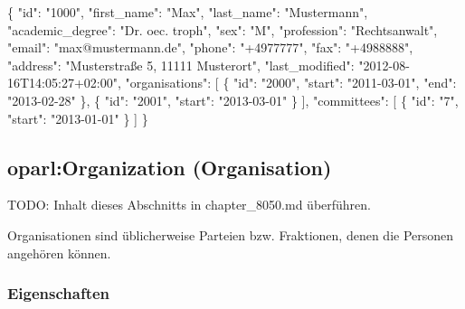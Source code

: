 \documentclass[,a4paper]{article}
\newenvironment{Shaded}{}{}
\newcommand{\DataTypeTok}[1]{\textcolor[rgb]{0.56,0.13,0.00}{{#1}}}
\newcommand{\StringTok}[1]{\textcolor[rgb]{0.25,0.44,0.63}{{#1}}}
\newcommand{\NormalTok}[1]{{#1}}
\begin{document}
\begin{Shaded}
\begin{Highlighting}[]
\NormalTok{\{}
    \DataTypeTok{"id"}\NormalTok{: }\StringTok{"1000"}\NormalTok{,}
    \DataTypeTok{"first_name"}\NormalTok{: }\StringTok{"Max"}\NormalTok{,}
    \DataTypeTok{"last_name"}\NormalTok{: }\StringTok{"Mustermann"}\NormalTok{,}
    \DataTypeTok{"academic_degree"}\NormalTok{: }\StringTok{"Dr. oec. troph"}\NormalTok{,}
    \DataTypeTok{"sex"}\NormalTok{: }\StringTok{"M"}\NormalTok{,}
    \DataTypeTok{"profession"}\NormalTok{: }\StringTok{"Rechtsanwalt"}\NormalTok{,}
    \DataTypeTok{"email"}\NormalTok{: }\StringTok{"max@mustermann.de"}\NormalTok{,}
    \DataTypeTok{"phone"}\NormalTok{: }\StringTok{"+4977777"}\NormalTok{,}
    \DataTypeTok{"fax"}\NormalTok{: }\StringTok{"+4988888"}\NormalTok{,}
    \DataTypeTok{"address"}\NormalTok{: }\StringTok{"Musterstraße 5, 11111 Musterort"}\NormalTok{,}
    \DataTypeTok{"last_modified"}\NormalTok{: }\StringTok{"2012-08-16T14:05:27+02:00"}\NormalTok{,}
    \DataTypeTok{"organisations"}\NormalTok{: [}
        \NormalTok{\{}
            \DataTypeTok{"id"}\NormalTok{: }\StringTok{"2000"}\NormalTok{,}
            \DataTypeTok{"start"}\NormalTok{: }\StringTok{"2011-03-01"}\NormalTok{,}
            \DataTypeTok{"end"}\NormalTok{: }\StringTok{"2013-02-28"}
        \NormalTok{\},}
        \NormalTok{\{}
            \DataTypeTok{"id"}\NormalTok{: }\StringTok{"2001"}\NormalTok{,}
            \DataTypeTok{"start"}\NormalTok{: }\StringTok{"2013-03-01"}
        \NormalTok{\}}
    \NormalTok{],}
    \DataTypeTok{"committees"}\NormalTok{: [}
        \NormalTok{\{}
            \DataTypeTok{"id"}\NormalTok{: }\StringTok{"7"}\NormalTok{,}
            \DataTypeTok{"start"}\NormalTok{: }\StringTok{"2013-01-01"}
        \NormalTok{\}}
    \NormalTok{]}
\NormalTok{\}}
\end{Highlighting}
\end{Shaded}

\subsection{oparl:Organization
(Organisation)}\label{oparlorganization-organisation}

TODO: Inhalt dieses Abschnitts in chapter\_8050.md überführen.

Organisationen sind üblicherweise Parteien bzw. Fraktionen, denen die
Personen angehören können.

\subsubsection{Eigenschaften}\label{eigenschaften-3}
\end{document}
